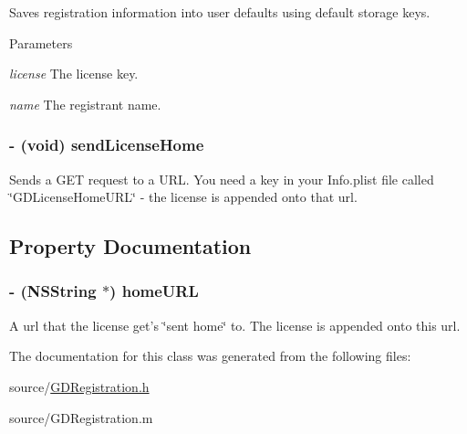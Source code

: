 Saves registration information into user defaults using default storage keys. 
\begin{DoxyParams}{Parameters}
\item[{\em license}]The license key. \item[{\em name}]The registrant name. \end{DoxyParams}
\hypertarget{interface_g_d_registration_a2aab3c30ff8931c4ce11159ecb3b830c}{
\subsubsection[{sendLicenseHome}]{\setlength{\rightskip}{0pt plus 5cm}-\/ (void) sendLicenseHome }}
\label{interface_g_d_registration_a2aab3c30ff8931c4ce11159ecb3b830c}


Sends a GET request to a URL. You need a key in your Info.plist file called \char`\"{}GDLicenseHomeURL\char`\"{} -\/ the license is appended onto that url. 

\subsection{Property Documentation}
\hypertarget{interface_g_d_registration_a8b801d18afbdb3062e0a79f39d0aee66}{
\subsubsection[{homeURL}]{\setlength{\rightskip}{0pt plus 5cm}-\/ ({\bf NSString} $\ast$) homeURL}}
\label{interface_g_d_registration_a8b801d18afbdb3062e0a79f39d0aee66}


A url that the license get's \char`\"{}sent home\char`\"{} to. The license is appended onto this url. 

The documentation for this class was generated from the following files:\begin{DoxyCompactItemize}
\item 
source/\hyperlink{_g_d_registration_8h}{GDRegistration.h}\item 
source/GDRegistration.m\end{DoxyCompactItemize}
